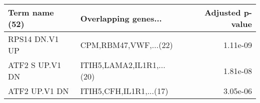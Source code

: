 \begin{tabular}{llr}
\toprule
 Term name (52) &      Overlapping genes... &  Adjusted p-value \\
\midrule
 RPS14 DN.V1 UP &     CPM,RBM47,VWF,...(22) &          1.11e-09 \\
ATF2 S UP.V1 DN & ITIH5,LAMA2,IL1R1,...(20) &          1.81e-08 \\
  ATF2 UP.V1 DN &   ITIH5,CFH,IL1R1,...(17) &          3.05e-06 \\
\bottomrule
\end{tabular}
